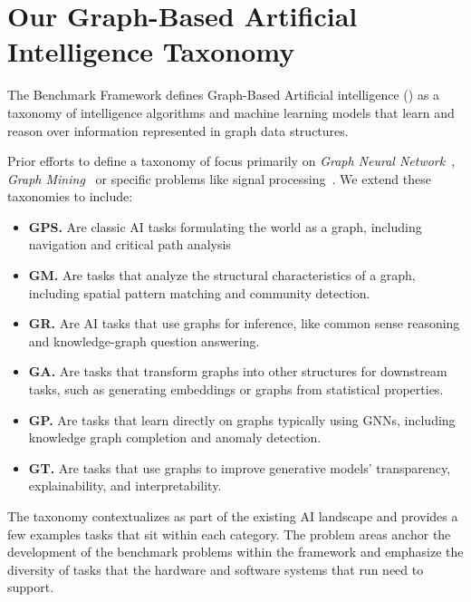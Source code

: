\section{Our Graph-Based Artificial Intelligence Taxonomy}
\label{section:12-graph-based-ai}
The \gai Benchmark Framework defines Graph-Based Artificial intelligence (\gai) as a taxonomy of intelligence algorithms and machine learning models that learn and reason over information represented in graph data structures.



Prior efforts to define a taxonomy of \gai focus primarily on \textit{Graph Neural Network}~\cite{Smith2021, Zhou2020a}, \textit{Graph Mining}~\cite{Chen2022a} or specific problems like signal processing~\cite{Xia2021}.
We extend these taxonomies to include:
\begin{itemize}
    \item \textbf{\ac{GPS}.} Are classic AI tasks formulating the world as a graph, including navigation and critical path analysis
    \item \textbf{\ac{GM}.} Are tasks that analyze the structural characteristics of a graph, including spatial pattern matching and community detection. 
    \item \textbf{\ac{GR}.} Are \ac{AI} tasks that use graphs for inference, like common sense reasoning and knowledge-graph question answering. 
    \item \textbf{\ac{GA}.} Are tasks that transform graphs into other structures for downstream tasks, such as generating embeddings or graphs from statistical properties.
    \item \textbf{\ac{GP}.} Are tasks that learn directly on graphs typically using \ac{GNN}s, including knowledge graph completion and anomaly detection. 
    \item \textbf{\ac{GT}.} Are tasks that use graphs to improve generative models' transparency, explainability, and interpretability. 
\end{itemize}

The taxonomy contextualizes \gai as part of the existing AI landscape and provides a few examples \gai tasks that sit within each \gai category. 
The \gai problem areas anchor the development of the \gai benchmark problems within the framework and emphasize the diversity of tasks that the hardware and software systems that run \gai need to support. 
